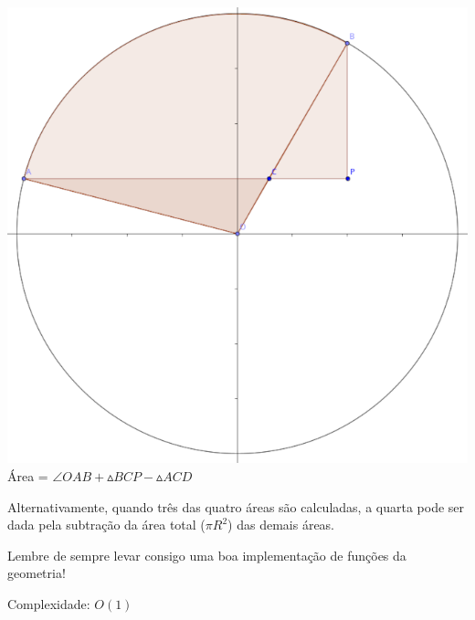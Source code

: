 \begin{center}
\begin{multicols}{2}
\includegraphics[scale=1.2]{A4.png}\\
Área = $\angle OAB + \vartriangle BCP - \vartriangle ACD$\\
\end{multicols}
\end{center}

Alternativamente, quando três das quatro áreas são calculadas, a quarta pode ser
dada pela subtração da área total ($\pi R^2$) das demais áreas.

Lembre de sempre levar consigo uma boa implementação de funções da geometria!

Complexidade: $O(1)$

